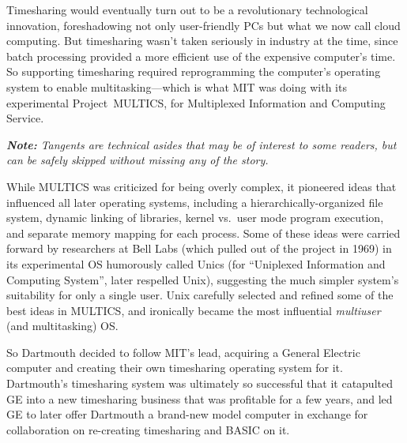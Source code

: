 Timesharing would eventually turn out to be a revolutionary
technological innovation, foreshadowing not only user-friendly PCs but what we now call cloud
computing.
But timesharing wasn't taken seriously in industry at the time, since batch
processing provided a more efficient use of the expensive computer's
time.  So supporting
timesharing required reprogramming the computer's operating
system to enable multitasking---which is what MIT was doing with its
experimental Project~MULTICS, for Multiplexed Information and
Computing Service.


  \begin{tangent}
\emph{\textbf{Note:} Tangents are technical asides that may be of
  interest to some readers, but can be safely skipped without missing any of the story.}

While MULTICS was
criticized for being overly complex, it pioneered ideas that influenced
all later operating systems, including a
hierarchically-organized file system, dynamic linking of libraries, 
kernel vs.\ user mode program execution, and
separate memory mapping for each process.
Some of these ideas were carried forward by researchers at Bell Labs
(which pulled out of the project in 1969) in its experimental OS 
humorously called Unics (for
``Uniplexed Information and Computing System'', later respelled Unix), suggesting the much simpler
system's suitability for only a single user.  Unix carefully selected
and refined some of the best ideas in MULTICS, and ironically
became the most influential \emph{multiuser} (and multitasking) OS.
  \end{tangent}

So Dartmouth decided to
follow MIT's lead, acquiring a General Electric computer
and creating their own timesharing
operating system for it.
Dartmouth's timesharing system was ultimately so successful that it
catapulted GE into a new timesharing business that was profitable for a
few years, and led GE to later offer Dartmouth a brand-new model
computer in exchange for collaboration on re-creating timesharing and
BASIC on it.


